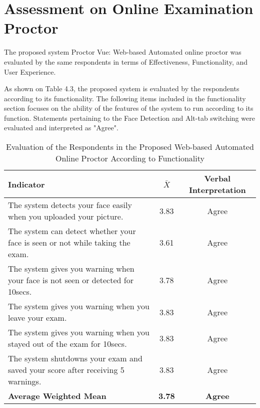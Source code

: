\section{Assessment on Online Examination Proctor}

The proposed system Proctor Vue: Web-based Automated online proctor was evaluated by the same respondents in terms of Effectiveness, Functionality, and User Experience.

As shown on Table 4.3, the proposed system is evaluated by the respondents according to its functionality.
The following items included in the functionality section focuses on the ability of the features of the system to run according to its function.
Statements pertaining to the Face Detection and Alt-tab switching were evaluated and interpreted as "Agree".

\pagebreak

\begin{table}[h!]
   \begin{center}
      \begin{tabular}{|m{20em}|c|c|}
         \hline
         \textbf{Indicator}                                                              & \textbf{$\bar{X}$} & \textbf{Verbal Interpretation} \\
         \hline
         The system detects your face easily when you uploaded your picture.             & 3.83               & Agree                          \\
         \hline
         The system can detect whether your face is seen or not while taking the exam.   & 3.61               & Agree                          \\
         \hline
         The system gives you warning when your face is not seen or detected for 10secs. & 3.78               & Agree                          \\
         \hline
         The system gives you warning when you leave your exam.                          & 3.83               & Agree                          \\
         \hline
         The system gives you warning when you stayed out of the exam for 10secs.        & 3.83               & Agree                          \\
         \hline
         The system shutdowns your exam and saved your score after receiving 5 warnings. & 3.83               & Agree                          \\
         \hline
         \textbf{Average Weighted Mean}                                                  & \textbf{3.78}      & \textbf{Agree}                 \\
         \hline
      \end{tabular}
   \end{center}
   \caption{Evaluation of the Respondents in the Proposed Web-based Automated Online Proctor According to Functionality}
\end{table}

